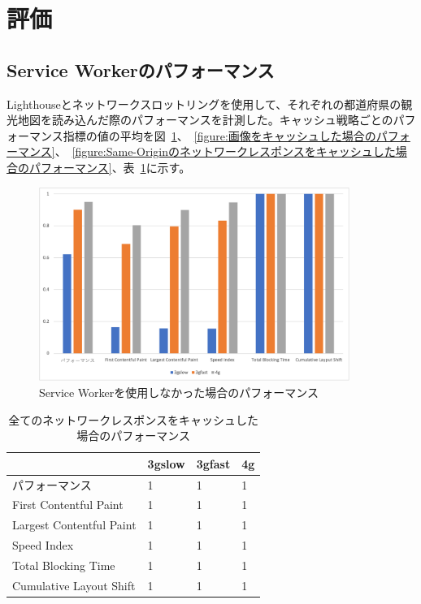 \section{評価}
\label{section:評価}
\subsection{Service Workerのパフォーマンス}
\label{subsubsection:Service Workerのパフォーマンス}
Lighthouseとネットワークスロットリングを使用して、それぞれの都道府県の観光地図を読み込んだ際のパフォーマンスを計測した。キャッシュ戦略ごとのパフォーマンス指標の値の平均を図~\ref{figure:Service Workerを使用しなかった場合のパフォーマンス}、~\ref{figure:画像をキャッシュした場合のパフォーマンス}、~\ref{figure:Same-Originのネットワークレスポンスをキャッシュした場合のパフォーマンス}、表~\ref{table:全てのネットワークレスポンスをキャッシュした場合のパフォーマンス}に示す。
\begin{figure}
  \centering
  \includegraphics[width=0.9\textwidth]{images/without_service_worker.png}
  \caption{Service Workerを使用しなかった場合のパフォーマンス}\label{figure:Service Workerを使用しなかった場合のパフォーマンス}
\end{figure}
\begin{table}
  \caption{全てのネットワークレスポンスをキャッシュした場合のパフォーマンス}
  \label{table:全てのネットワークレスポンスをキャッシュした場合のパフォーマンス}
  \centering
  \begin{tabular}{|p{15em}|p{5em}|p{5em}|p{5em}|}
    \hline
    & 3gslow & 3gfast & 4g \\ \hline
    パフォーマンス & 1 & 1 & 1 \\ \hline
    First Contentful Paint & 1 & 1 & 1 \\ \hline
    Largest Contentful Paint & 1 & 1 & 1 \\ \hline
    Speed Index & 1 & 1 & 1 \\ \hline
    Total Blocking Time & 1 & 1 & 1 \\ \hline
    Cumulative Layout Shift & 1 & 1 & 1 \\ \hline
  \end{tabular}
\end{table}
